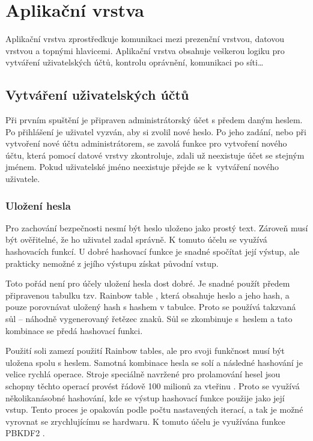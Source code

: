 \documentclass[thesis=B,czech]{FITthesis}[2012/10/20]
\begin{document}
\section{Aplikační vrstva}

Aplikační vrstva zprostředkuje komunikaci mezi prezenční vrstvou, datovou vrstvou a topnými hlavicemi. Aplikační vrstva obsahuje veškerou logiku pro vytváření uživatelských účtů, kontrolu oprávnění, komunikaci po síti\dots{}

\subsection{Vytváření uživatelských účtů}

Při prvním spuštění je připraven administrátorský účet s předem daným heslem. Po přihlášení je uživatel vyzván, aby si zvolil nové heslo. Po jeho zadání, nebo při vytvoření nové účtu administrátorem, se zavolá funkce pro vytvoření nového účtu, která pomocí datové vrstvy zkontroluje, zdali už neexistuje účet se stejným jménem. Pokud uživatelské jméno neexistuje přejde se k~vytváření nového uživatele.

\subsubsection{Uložení hesla}

Pro zachování bezpečnosti nesmí být heslo uloženo jako prostý text. Zároveň musí být ověřitelné, že ho uživatel zadal správně. K tomuto účelu se využívá hashovacích funkcí. U dobré hashovací funkce je snadné spočítat její výstup, ale prakticky nemožné z jejího výstupu získat původní vstup.

Toto pořád není pro účely uložení hesla dost dobré. Je snadné použít předem připravenou tabulku tzv. Rainbow table \cite{rainbow}, která obsahuje heslo a jeho hash, a pouze porovnávat uložený hash s hashem v tabulce. Proto se používá takzvaná sůl -- náhodně vygenerovaný řetězec znaků. Sůl se zkombinuje s~heslem a tato kombinace se předá hashovací funkci.

Použití soli zamezí použití Rainbow tables, ale pro svoji funkčnost musí být uložena spolu s heslem. Samotná kombinace hesla se solí a následné hashování je velice rychlá operace. Stroje speciálně navržené pro prolamování hesel jsou schopny těchto operací provést řádově 100 milionů za vteřinu \cite{passwords}. Proto se využívá několikanásobné hashování, kde se výstup hashovací funkce použije jako její vstup. Tento proces je opakován podle počtu nastavených iterací, a tak je možné vyrovnat se zrychlujícímu se hardwaru. K tomuto účelu je využívána funkce PBKDF2 \cite{passwords}.
\end{document}
